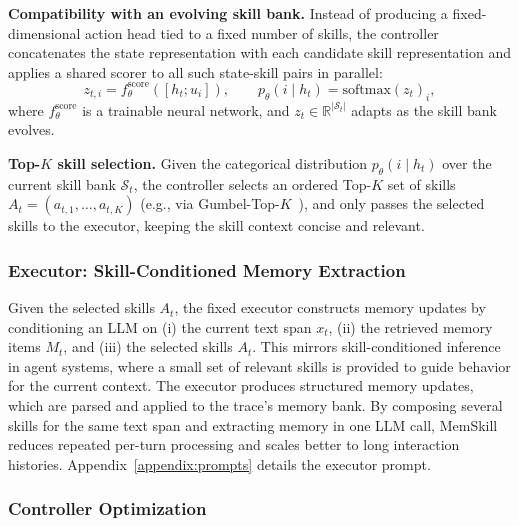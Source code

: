 \textbf{Compatibility with an evolving skill bank.}
Instead of producing a fixed-dimensional action head tied to a fixed number of skills, the controller concatenates the state representation with each candidate skill representation and applies a shared scorer to all such state-skill pairs in parallel:
\begin{equation}
z_{t,i} = f_{\theta}^{\mathrm{score}}\!\left([h_t;u_i]\right), \qquad
p_\theta(i \mid h_t) = \mathrm{softmax}(z_t)_i,
\end{equation}
where $f_{\theta}^{\mathrm{score}}$ is a trainable neural network, and $z_t \in \mathbb{R}^{|\mathcal{S}_t|}$ adapts as the skill bank evolves.




\textbf{Top-$K$ skill selection.}
Given the categorical distribution $p_\theta(i\mid h_t)$ over the current skill bank $\mathcal{S}_t$, the controller selects an ordered Top-$K$ set of skills
$A_t=(a_{t,1},\dots,a_{t,K})$ (e.g., via Gumbel-Top-$K$~\citep{kool2019stochastic}), and only passes the selected skills to the executor, keeping the skill context concise and relevant.





\subsubsection{Executor: Skill-Conditioned Memory Extraction}\label{sec:executor}






Given the selected skills $A_t$, the fixed executor constructs memory updates by conditioning an LLM on (i) the current text span $x_t$, (ii) the retrieved memory items $M_t$, and (iii) the selected skills $A_t$. This mirrors skill-conditioned inference in agent systems, where a small set of relevant skills is provided to guide behavior for the current context.
The executor produces structured memory updates, which are parsed and applied to the trace's memory bank. 
By composing several skills for the same text span and extracting memory in one LLM call, MemSkill reduces repeated per-turn processing and scales better to long interaction histories.
Appendix~\ref{appendix:prompts} details the executor prompt.




\subsubsection{Controller Optimization}\label{sec:controller_optimization}



